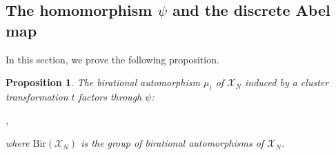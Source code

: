 \documentclass[11pt]{article} %
\newtheorem{proposition}[theorem]{Proposition}
\theoremstyle{definition}
\newcommand{\Z}{{\mathbb Z}}
\newcommand{\T}{{\mathbb T}}
\newcommand{\ra}{\rightarrow}
\begin{document}
\subsection{The homomorphism $\psi$ and the discrete Abel map} 
In this section, we prove the following proposition.
\begin{proposition}\label{coruniq}
The birational automorphism $\mu_t$ of $\mathcal X_N$ induced by a cluster transformation $t$ factors through $\psi$:
\begin{center}
    ,
\end{center}
where $\text{Bir}(\mathcal X_N)$ is the group of birational automorphisms of $\mathcal X_N$.
\end{proposition}
\end{document}
